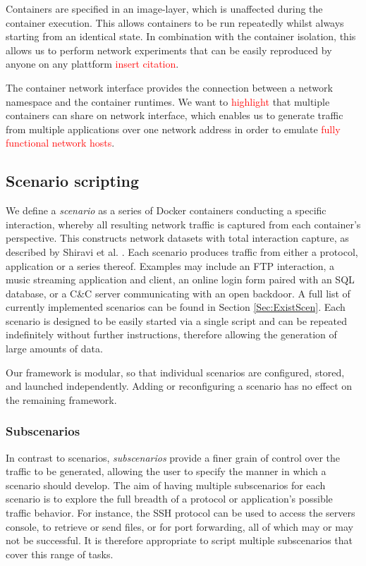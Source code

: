 \documentclass{article}
\begin{document}
Containers are specified in an image-layer, which is unaffected during the container execution.
This allows containers to be run repeatedly whilst always starting from an identical state. In combination with the container isolation, this allows us to perform network experiments that can be easily reproduced by anyone on any plattform \textcolor{red}{insert citation}. 


The container network interface provides the connection between a network namespace and the container runtimes. We want to \textcolor{red}{highlight} that multiple containers can share on network interface, which enables us to generate traffic from multiple applications over one network address in order to emulate \textcolor{red}{fully functional network hosts}.
 

\subsection{Scenario scripting}\label{Sec:Scenarios}

We define a \emph{scenario} as a series of Docker containers conducting a specific interaction, whereby all resulting network traffic is captured from each container's perspective. This constructs network datasets with total interaction capture, as described by Shiravi et al. \cite{shiravi2012toward}. Each scenario produces traffic from either a protocol, application or a series thereof. %
Examples may include an FTP interaction, a music streaming application and client, an online login form paired with an SQL database, or a C\&C server communicating with an open backdoor. A full list of currently implemented scenarios can be found in Section \ref{Sec:ExistScen}.
Each scenario is designed to be easily started via a single script and can be repeated indefinitely without further instructions, therefore allowing the generation of large amounts of data.

Our framework is modular, so that individual scenarios are configured, stored, and launched independently. Adding or reconfiguring a scenario has no effect on the remaining framework.

\subsubsection*{Subscenarios} \label{Sec:Subscenarios}

In contrast to scenarios, \textit{subscenarios} provide a finer grain of control over the traffic to be generated, allowing the user to specify the manner in which a scenario should develop. The aim of having multiple subscenarios for each scenario is to explore the full breadth of a protocol or application's possible traffic behavior. For instance, the SSH protocol can be used to access the servers console, to retrieve or send files, or for port forwarding, all of which may or may not be successful. It is therefore appropriate to script multiple subscenarios that cover this range of tasks.
\end{document}
